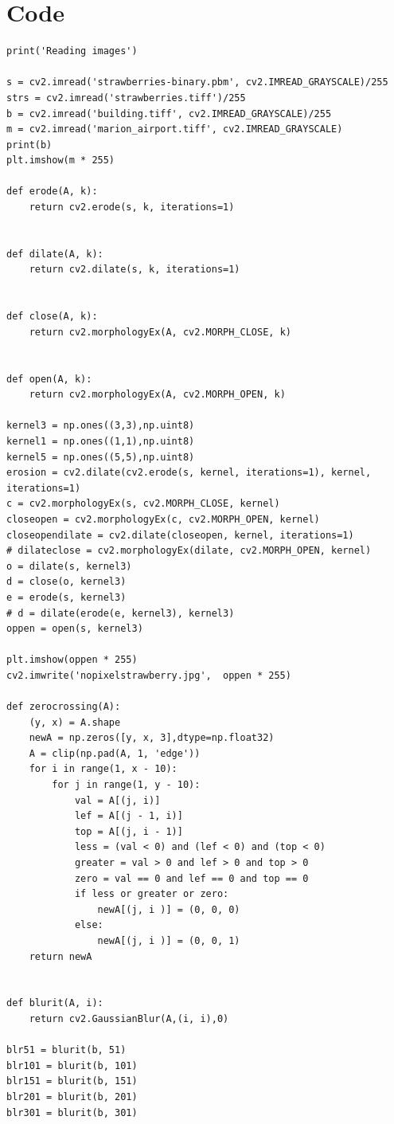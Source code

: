 \documentclass{article}
\begin{document}
\section{Code}

\begin{verbatim}
print('Reading images')

s = cv2.imread('strawberries-binary.pbm', cv2.IMREAD_GRAYSCALE)/255
strs = cv2.imread('strawberries.tiff')/255
b = cv2.imread('building.tiff', cv2.IMREAD_GRAYSCALE)/255
m = cv2.imread('marion_airport.tiff', cv2.IMREAD_GRAYSCALE)
print(b)
plt.imshow(m * 255)

def erode(A, k):
    return cv2.erode(s, k, iterations=1)


def dilate(A, k):
    return cv2.dilate(s, k, iterations=1)


def close(A, k):
    return cv2.morphologyEx(A, cv2.MORPH_CLOSE, k)


def open(A, k):
    return cv2.morphologyEx(A, cv2.MORPH_OPEN, k)

kernel3 = np.ones((3,3),np.uint8)
kernel1 = np.ones((1,1),np.uint8)
kernel5 = np.ones((5,5),np.uint8)
erosion = cv2.dilate(cv2.erode(s, kernel, iterations=1), kernel, iterations=1)
c = cv2.morphologyEx(s, cv2.MORPH_CLOSE, kernel)
closeopen = cv2.morphologyEx(c, cv2.MORPH_OPEN, kernel)
closeopendilate = cv2.dilate(closeopen, kernel, iterations=1)
# dilateclose = cv2.morphologyEx(dilate, cv2.MORPH_OPEN, kernel)
o = dilate(s, kernel3)
d = close(o, kernel3)
e = erode(s, kernel3)
# d = dilate(erode(e, kernel3), kernel3)
oppen = open(s, kernel3)

plt.imshow(oppen * 255)
cv2.imwrite('nopixelstrawberry.jpg',  oppen * 255)

def zerocrossing(A):
    (y, x) = A.shape
    newA = np.zeros([y, x, 3],dtype=np.float32)
    A = clip(np.pad(A, 1, 'edge'))
    for i in range(1, x - 10):
        for j in range(1, y - 10):
            val = A[(j, i)]
            lef = A[(j - 1, i)]
            top = A[(j, i - 1)]
            less = (val < 0) and (lef < 0) and (top < 0)
            greater = val > 0 and lef > 0 and top > 0
            zero = val == 0 and lef == 0 and top == 0
            if less or greater or zero:
                newA[(j, i )] = (0, 0, 0)
            else:
                newA[(j, i )] = (0, 0, 1)
    return newA
        
        
def blurit(A, i):
    return cv2.GaussianBlur(A,(i, i),0)

blr51 = blurit(b, 51)
blr101 = blurit(b, 101)
blr151 = blurit(b, 151)
blr201 = blurit(b, 201)
blr301 = blurit(b, 301)



\end{verbatim}
\end{document}
